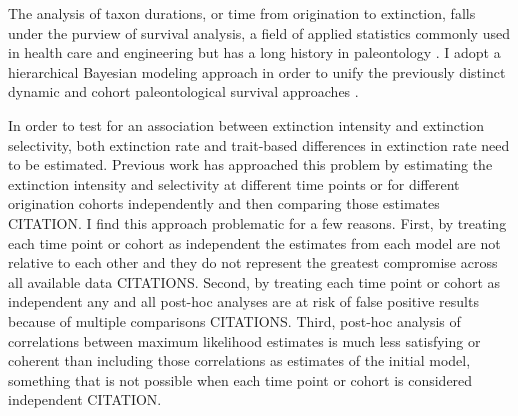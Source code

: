\documentclass[11pt]{article}
\begin{document}
The analysis of taxon durations, or time from origination to extinction, falls under the purview of survival analysis, a field of applied statistics commonly used in health care and engineering \citep{Klein2003} but has a long history in paleontology \citep{Simpson1944,Simpson1953,VanValen1973,VanValen1979,Smits2015,Crampton2016}. I adopt a hierarchical Bayesian modeling approach \citep{Gelman2007,Gelman2013d} in order to unify the previously distinct dynamic and cohort paleontological survival approaches \citep{VanValen1973,VanValen1979,Raup1978,Raup1975,Foote1988,Baumiller1993,Simpson2006,Crampton2016,Ezard2012b}. 

In order to test for an association between extinction intensity and extinction selectivity, both extinction rate and trait-based differences in extinction rate need to be estimated. Previous work has approached this problem by estimating the extinction intensity and selectivity at different time points or for different origination cohorts independently and then comparing those estimates CITATION. I find this approach problematic for a few reasons. First, by treating each time point or cohort as independent the estimates from each model are not relative to each other and they do not represent the greatest compromise across all available data CITATIONS. Second, by treating each time point or cohort as independent any and all post-hoc analyses are at risk of false positive results because of multiple comparisons CITATIONS. Third, post-hoc analysis of correlations between maximum likelihood estimates is much less satisfying or coherent than including those correlations as estimates of the initial model, something that is not possible when each time point or cohort is considered independent CITATION. 

\end{document}
